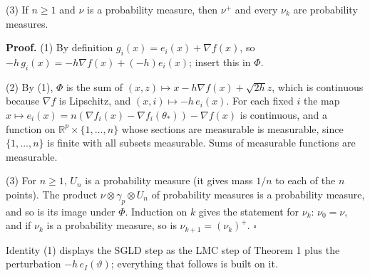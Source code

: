 \documentclass[11pt,a4paper]{report}
\begin{document}
(3) If \(n\ge1\) and \(\nu\) is a probability measure, then \(\nu^+\) and every \(\nu_k\) are probability measures.




\textbf{Proof.} (1) By definition \(g_i(x)=e_i(x)+\nabla f(x)\), so \(-h\,g_i(x)=-h\nabla f(x)+(-h)e_i(x)\); insert this in \(\Phi\).




(2) By (1), \(\Phi\) is the sum of \((x,z)\mapsto x-h\nabla f(x)+\sqrt{2h}z\), which is continuous because \(\nabla f\) is Lipschitz, and \((x,i)\mapsto-h\,e_i(x)\). For each fixed \(i\) the map \(x\mapsto e_i(x)=n(\nabla f_i(x)-\nabla f_i(\theta_*))-\nabla f(x)\) is continuous, and a function on \(\mathbb R^p\times\{1,\dots,n\}\) whose sections are measurable is measurable, since \(\{1,\dots,n\}\) is finite with all subsets measurable. Sums of measurable functions are measurable.




(3) For \(n\ge1\), \(U_n\) is a probability measure (it gives mass \(1/n\) to each of the \(n\) points). The product \(\nu\otimes\gamma_p\otimes U_n\) of probability measures is a probability measure, and so is its image under \(\Phi\). Induction on \(k\) gives the statement for \(\nu_k\): \(\nu_0=\nu\), and if \(\nu_k\) is a probability measure, so is \(\nu_{k+1}=(\nu_k)^+\). \(\square\)




Identity (1) displays the SGLD step as the LMC step of Theorem 1 plus the perturbation \(-h\,e_I(\vartheta)\); everything that follows is built on it.
\end{document}
